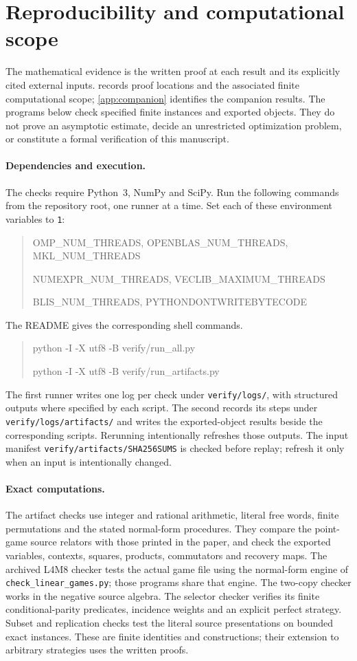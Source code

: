 \section{Reproducibility and computational scope}\label{app:audits}

The mathematical evidence is the written proof at each result and its explicitly cited external inputs.  records proof locations and the associated finite computational scope; \cref{app:companion} identifies the companion results. The programs below check specified finite instances and exported objects. They do not prove an asymptotic estimate, decide an unrestricted optimization problem, or constitute a formal verification of this manuscript.

\paragraph{Dependencies and execution.}
The checks require Python~3, NumPy and SciPy. Run the following commands from the repository root, one runner at a time. Set each of these environment variables to \texttt{1}:
\begin{quote}\ttfamily\small
OMP\_NUM\_THREADS, OPENBLAS\_NUM\_THREADS, MKL\_NUM\_THREADS\par
NUMEXPR\_NUM\_THREADS, VECLIB\_MAXIMUM\_THREADS\par
BLIS\_NUM\_THREADS, PYTHONDONTWRITEBYTECODE
\end{quote}
The README gives the corresponding shell commands.
\begin{quote}\ttfamily\small
python -I -X utf8 -B verify/run\_all.py\par
python -I -X utf8 -B verify/run\_artifacts.py
\end{quote}
The first runner writes one log per check under \texttt{verify/logs/}, with structured outputs where specified by each script. The second records its steps under \texttt{verify/logs/artifacts/} and writes the exported-object results beside the corresponding scripts. Rerunning intentionally refreshes those outputs. The input manifest \texttt{verify/artifacts/SHA256SUMS} is checked before replay; refresh it only when an input is intentionally changed.

\paragraph{Exact computations.}
The artifact checks use integer and rational arithmetic, literal free words, finite permutations and the stated normal-form procedures. They compare the point-game source relators with those printed in the paper, and check the exported variables, contexts, squares, products, commutators and recovery maps. The archived L4M8 checker tests the actual game file using the normal-form engine of \texttt{check\_linear\_games.py}; those programs share that engine. The two-copy checker works in the negative source algebra. The selector checker verifies its finite conditional-parity predicates, incidence weights and an explicit perfect strategy. Subset and replication checks test the literal source presentations on bounded exact instances. These are finite identities and constructions; their extension to arbitrary strategies uses the written proofs.

